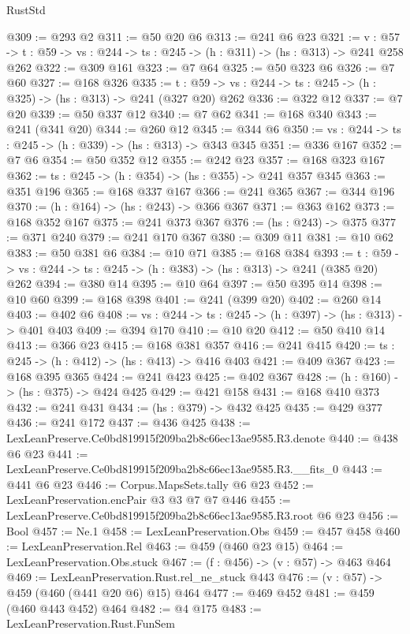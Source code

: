 \begin{lexlean}{RustStd}
\begin{coremodule}
@309 := @293 @2
@311 := @50 @20 @6
@313 := @241 @6 @23
@321 := {v : @57} ->
  {t : @59} -> {vs : @244} -> {ts : @245} -> (h : @311) -> (hs : @313) -> @241 @258 @262
@322 := @309 @161
@323 := @7 @64
@325 := @50 @323 @6
@326 := @7 @60
@327 := @168 @326
@335 := {t : @59} -> {vs : @244} -> {ts : @245} -> (h : @325) -> (hs : @313) -> @241 (@327 @20) @262
@336 := @322 @12
@337 := @7 @20
@339 := @50 @337 @12
@340 := @7 @62
@341 := @168 @340
@343 := @241 (@341 @20)
@344 := @260 @12
@345 := @344 @6
@350 := {vs : @244} -> {ts : @245} -> (h : @339) -> (hs : @313) -> @343 @345
@351 := @336 @167
@352 := @7 @6
@354 := @50 @352 @12
@355 := @242 @23
@357 := @168 @323 @167
@362 := {ts : @245} -> (h : @354) -> (hs : @355) -> @241 @357 @345
@363 := @351 @196
@365 := @168 @337 @167
@366 := @241 @365
@367 := @344 @196
@370 := (h : @164) -> (hs : @243) -> @366 @367
@371 := @363 @162
@373 := @168 @352 @167
@375 := @241 @373 @367
@376 := (hs : @243) -> @375
@377 := @371 @240
@379 := @241 @170 @367
@380 := @309 @11
@381 := @10 @62
@383 := @50 @381 @6
@384 := @10 @71
@385 := @168 @384
@393 := {t : @59} -> {vs : @244} -> {ts : @245} -> (h : @383) -> (hs : @313) -> @241 (@385 @20) @262
@394 := @380 @14
@395 := @10 @64
@397 := @50 @395 @14
@398 := @10 @60
@399 := @168 @398
@401 := @241 (@399 @20)
@402 := @260 @14
@403 := @402 @6
@408 := {vs : @244} -> {ts : @245} -> (h : @397) -> (hs : @313) -> @401 @403
@409 := @394 @170
@410 := @10 @20
@412 := @50 @410 @14
@413 := @366 @23
@415 := @168 @381 @357
@416 := @241 @415
@420 := {ts : @245} -> (h : @412) -> (hs : @413) -> @416 @403
@421 := @409 @367
@423 := @168 @395 @365
@424 := @241 @423
@425 := @402 @367
@428 := (h : @160) -> (hs : @375) -> @424 @425
@429 := @421 @158
@431 := @168 @410 @373
@432 := @241 @431
@434 := (hs : @379) -> @432 @425
@435 := @429 @377
@436 := @241 @172
@437 := @436 @425
@438 := LexLeanPreserve.Ce0bd819915f209ba2b8c66ec13ae9585.R3.denote
@440 := @438 @6 @23
@441 := LexLeanPreserve.Ce0bd819915f209ba2b8c66ec13ae9585.R3.__fits_0
@443 := @441 @6 @23
@446 := Corpus.MapsSets.tally @6 @23
@452 := LexLeanPreservation.encPair @3 @3 @7 @7 @446
@455 := LexLeanPreserve.Ce0bd819915f209ba2b8c66ec13ae9585.R3.root @6 @23
@456 := Bool
@457 := Ne.{1}
@458 := LexLeanPreservation.Obs
@459 := @457 @458
@460 := LexLeanPreservation.Rel
@463 := @459 (@460 @23 @15)
@464 := LexLeanPreservation.Obs.stuck
@467 := (f : @456) -> (v : @57) -> @463 @464
@469 := LexLeanPreservation.Rust.rel_ne_stuck @443
@476 := (v : @57) -> @459 (@460 (@441 @20 @6) @15) @464
@477 := @469 @452
@481 := @459 (@460 @443 @452) @464
@482 := @4 @175
@483 := LexLeanPreservation.Rust.FunSem

\end{coremodule}
\end{lexlean}

